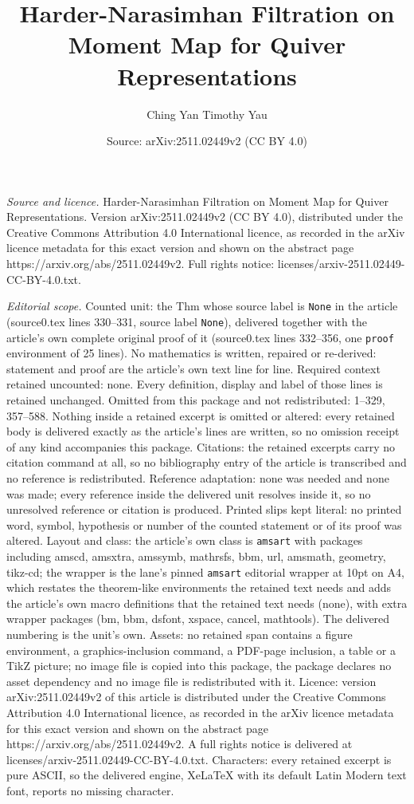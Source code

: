 \documentclass[10pt,a4paper]{amsart}
\title[Harder-Narasimhan Filtration on Moment Map for Quiver Repres]{Harder-Narasimhan Filtration on Moment Map for Quiver Representations}
\author{Ching Yan Timothy Yau}
\date{Source: arXiv:2511.02449v2 (CC BY 4.0)}
\begin{document}
\maketitle

\noindent\emph{Source and licence.} Harder-Narasimhan Filtration on Moment Map for Quiver Representations. Version arXiv:2511.02449v2 (CC BY 4.0), distributed under the Creative Commons Attribution 4.0 International licence, as recorded in the arXiv licence metadata for this exact version and shown on the abstract page https://arxiv.org/abs/2511.02449v2. Full rights notice: licenses/arxiv-2511.02449-CC-BY-4.0.txt.\par\smallskip

\noindent\textit{Editorial scope.} Counted unit: the Thm whose source label is \texttt{None} in the article (source0.tex lines 330--331, source label \texttt{None}), delivered together with the article's own complete original proof of it (source0.tex lines 332--356, one \texttt{proof} environment of 25 lines). No mathematics is written, repaired or re-derived: statement and proof are the article's own text line for line. Required context retained uncounted: none. Every definition, display and label of those lines is retained unchanged. Omitted from this package and not redistributed: 1--329, 357--588. Nothing inside a retained excerpt is omitted or altered: every retained body is delivered exactly as the article's lines are written, so no omission receipt of any kind accompanies this package. Citations: the retained excerpts carry no citation command at all, so no bibliography entry of the article is transcribed and no reference is redistributed. Reference adaptation: none was needed and none was made; every reference inside the delivered unit resolves inside it, so no unresolved reference or citation is produced. Printed slips kept literal: no printed word, symbol, hypothesis or number of the counted statement or of its proof was altered. Layout and class: the article's own class is \texttt{amsart} with packages including amscd, amsxtra, amssymb, mathrsfs, bbm, url, amsmath, geometry, tikz-cd; the wrapper is the lane's pinned \texttt{amsart} editorial wrapper at 10pt on A4, which restates the theorem-like environments the retained text needs and adds the article's own macro definitions that the retained text needs (none), with extra wrapper packages (bm, bbm, dsfont, xspace, cancel, mathtools). The delivered numbering is the unit's own. Assets: no retained span contains a figure environment, a graphics-inclusion command, a PDF-page inclusion, a table or a TikZ picture; no image file is copied into this package, the package declares no asset dependency and no image file is redistributed with it. Licence: version arXiv:2511.02449v2 of this article is distributed under the Creative Commons Attribution 4.0 International licence, as recorded in the arXiv licence metadata for this exact version and shown on the abstract page https://arxiv.org/abs/2511.02449v2. A full rights notice is delivered at licenses/arxiv-2511.02449-CC-BY-4.0.txt. Characters: every retained excerpt is pure ASCII, so the delivered engine, XeLaTeX with its default Latin Modern text font, reports no missing character.
\end{document}
